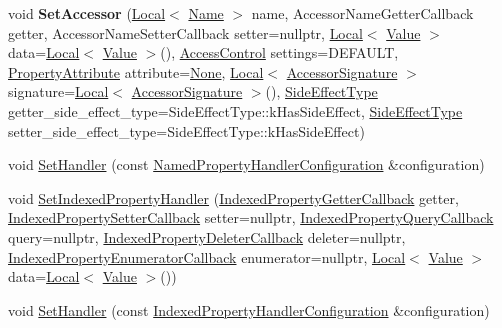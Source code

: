 \begin{DoxyCompactItemize}
void {\bfseries Set\+Accessor} (\mbox{\hyperlink{classv8_1_1Local}{Local}}$<$ \mbox{\hyperlink{classv8_1_1Name}{Name}} $>$ name, Accessor\+Name\+Getter\+Callback getter, Accessor\+Name\+Setter\+Callback setter=nullptr, \mbox{\hyperlink{classv8_1_1Local}{Local}}$<$ \mbox{\hyperlink{classv8_1_1Value}{Value}} $>$ data=\mbox{\hyperlink{classv8_1_1Local}{Local}}$<$ \mbox{\hyperlink{classv8_1_1Value}{Value}} $>$(), \mbox{\hyperlink{namespacev8_a31d8355cb043d7d2dda3f4a52760b64e}{Access\+Control}} settings=D\+E\+F\+A\+U\+LT, \mbox{\hyperlink{namespacev8_a05f25f935e108a1ea2d150e274602b87}{Property\+Attribute}} attribute=\mbox{\hyperlink{namespacev8_a05f25f935e108a1ea2d150e274602b87a7ab4d58719c33b3ea2dfaefa29b111df}{None}}, \mbox{\hyperlink{classv8_1_1Local}{Local}}$<$ \mbox{\hyperlink{classv8_1_1AccessorSignature}{Accessor\+Signature}} $>$ signature=\mbox{\hyperlink{classv8_1_1Local}{Local}}$<$ \mbox{\hyperlink{classv8_1_1AccessorSignature}{Accessor\+Signature}} $>$(), \mbox{\hyperlink{namespacev8_a29711319c2b9fc7716d65faee2f7b9cb}{Side\+Effect\+Type}} getter\+\_\+side\+\_\+effect\+\_\+type=Side\+Effect\+Type\+::k\+Has\+Side\+Effect, \mbox{\hyperlink{namespacev8_a29711319c2b9fc7716d65faee2f7b9cb}{Side\+Effect\+Type}} setter\+\_\+side\+\_\+effect\+\_\+type=Side\+Effect\+Type\+::k\+Has\+Side\+Effect)
\item 
void \mbox{\hyperlink{classv8_1_1ObjectTemplate_a3d5666f1e9b0f46df6b4dbb7cfbb6114}{Set\+Handler}} (const \mbox{\hyperlink{structv8_1_1NamedPropertyHandlerConfiguration}{Named\+Property\+Handler\+Configuration}} \&configuration)
\item 
void \mbox{\hyperlink{classv8_1_1ObjectTemplate_a7b426fe5c637216d45f2915ce96b0027}{Set\+Indexed\+Property\+Handler}} (\mbox{\hyperlink{namespacev8_a48e7816ba64447bf32a25d194588daaf}{Indexed\+Property\+Getter\+Callback}} getter, \mbox{\hyperlink{namespacev8_a4ac7cc6185ebc8b6a199f9fa8e6bf5c3}{Indexed\+Property\+Setter\+Callback}} setter=nullptr, \mbox{\hyperlink{namespacev8_a980b62c33eb664783e61e25c3b27f9ee}{Indexed\+Property\+Query\+Callback}} query=nullptr, \mbox{\hyperlink{namespacev8_a53863728de14cde48dd6543207b2f2da}{Indexed\+Property\+Deleter\+Callback}} deleter=nullptr, \mbox{\hyperlink{namespacev8_adbb0a6d5537371953f9ba807d4f6275e}{Indexed\+Property\+Enumerator\+Callback}} enumerator=nullptr, \mbox{\hyperlink{classv8_1_1Local}{Local}}$<$ \mbox{\hyperlink{classv8_1_1Value}{Value}} $>$ data=\mbox{\hyperlink{classv8_1_1Local}{Local}}$<$ \mbox{\hyperlink{classv8_1_1Value}{Value}} $>$())
\item 
void \mbox{\hyperlink{classv8_1_1ObjectTemplate_abc92c2889776a5a1ef6831f9c3da3783}{Set\+Handler}} (const \mbox{\hyperlink{structv8_1_1IndexedPropertyHandlerConfiguration}{Indexed\+Property\+Handler\+Configuration}} \&configuration)

\end{DoxyCompactItemize}
